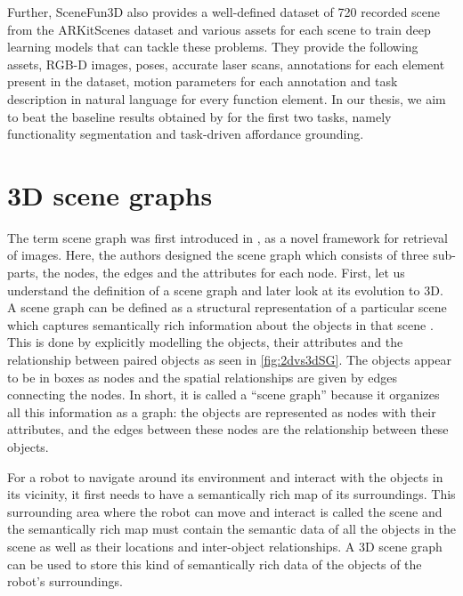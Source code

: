 Further, SceneFun3D also provides a well-defined dataset of 720 recorded scene from the ARKitScenes dataset and various assets for each scene 
to train deep learning models that can tackle these problems. They provide the following assets, RGB-D images, poses, accurate laser scans, 
annotations for each element present in the dataset, motion parameters for each annotation and task description in natural language for every function element.
In our thesis, we aim to beat the baseline results obtained by \citet{delitzas2024scenefun3d} for the first two tasks, namely 
functionality segmentation and task-driven affordance grounding. 

\section{3D scene graphs}
The term scene graph was first introduced in \cite{7298990}, as a novel framework for retrieval of images. Here, the authors designed the scene graph which 
consists of three sub-parts, the nodes, the edges and the attributes for each node. First, let us understand the definition of a scene graph and later
look at its evolution to 3D. \\
A scene graph can be defined as a structural representation of a particular scene which captures semantically rich information about the objects in that scene \cite{zhu2022scenegraphgenerationcomprehensive}.
This is done by explicitly modelling the objects, their attributes and the relationship between paired objects as seen in \cref{fig:2dvs3dSG}. The objects appear to be in boxes as nodes
and the spatial relationships are given by edges connecting the nodes.
In short, it is called a “scene graph” because it organizes all this information as a graph: the objects are represented as nodes with their attributes, and the edges between these 
nodes are the relationship between these objects. 

For a robot to navigate around its environment and interact with the objects in its vicinity, it first needs to have a semantically rich map of its surroundings. 
This surrounding area where the robot can move and interact is called the scene and the semantically rich map must contain the 
semantic data of all the objects in the scene as well as their locations and inter-object relationships. 
A 3D scene graph can be used to store this kind of semantically rich data of the objects of the robot’s surroundings. 

